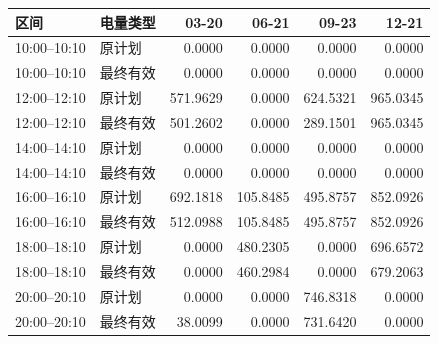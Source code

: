 \begin{tabular}{llrrrr}
\toprule
区间 & 电量类型 & 03-20 & 06-21 & 09-23 & 12-21 \\
\midrule
10:00--10:10 & 原计划 & 0.0000 & 0.0000 & 0.0000 & 0.0000 \\
10:00--10:10 & 最终有效 & 0.0000 & 0.0000 & 0.0000 & 0.0000 \\
12:00--12:10 & 原计划 & 571.9629 & 0.0000 & 624.5321 & 965.0345 \\
12:00--12:10 & 最终有效 & 501.2602 & 0.0000 & 289.1501 & 965.0345 \\
14:00--14:10 & 原计划 & 0.0000 & 0.0000 & 0.0000 & 0.0000 \\
14:00--14:10 & 最终有效 & 0.0000 & 0.0000 & 0.0000 & 0.0000 \\
16:00--16:10 & 原计划 & 692.1818 & 105.8485 & 495.8757 & 852.0926 \\
16:00--16:10 & 最终有效 & 512.0988 & 105.8485 & 495.8757 & 852.0926 \\
18:00--18:10 & 原计划 & 0.0000 & 480.2305 & 0.0000 & 696.6572 \\
18:00--18:10 & 最终有效 & 0.0000 & 460.2984 & 0.0000 & 679.2063 \\
20:00--20:10 & 原计划 & 0.0000 & 0.0000 & 746.8318 & 0.0000 \\
20:00--20:10 & 最终有效 & 38.0099 & 0.0000 & 731.6420 & 0.0000 \\
\bottomrule
\end{tabular}
